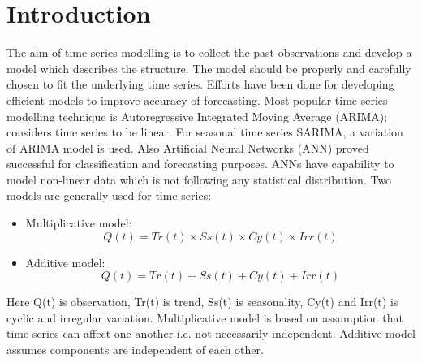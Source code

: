 \documentclass[runningheads]{llncs}
\begin{document}
\section{Introduction}
The aim of time series modelling is to collect the past observations and develop a model which describes the structure. The model should be properly and carefully chosen to fit the underlying time series. Efforts have been done for developing efficient models to improve accuracy of forecasting. Most popular time series modelling technique is Autoregressive Integrated Moving Average (ARIMA); considers time series to be linear. For seasonal time series SARIMA, a variation of ARIMA model is used. Also Artificial Neural Networks (ANN) proved successful for classification and forecasting purposes. ANNs have capability to model non-linear data which is not following any statistical distribution. Two models are generally used for time series:
\begin{itemize}
\item Multiplicative model: \begin{equation}
	Q(t) = Tr(t) {\times} Ss(t) {\times} Cy(t) {\times} Irr(t) 
\end{equation}
\item Additive model: \begin{equation}
   Q(t) = Tr(t) + Ss(t) + Cy(t) + Irr(t) 
\end{equation}
\end{itemize}
Here Q(t) is observation, Tr(t) is trend, Ss(t) is seasonality, Cy(t) and Irr(t) is cyclic and irregular variation.
Multiplicative model is based on assumption that time series can affect one another i.e. not necessarily independent. Additive model assumes components are independent of each other.
%
%
%
\end{document}
